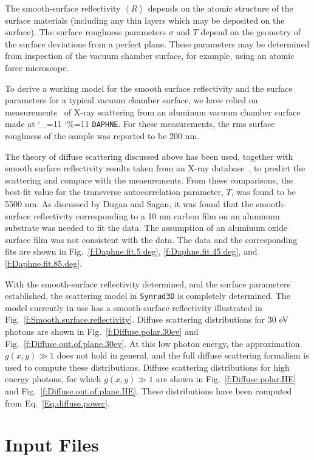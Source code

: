 \documentclass[11pt]{article}
\newcommand{\srthree}{\texttt{Synrad3D}\xspace}
\newcommand\ttcmd{\begingroup\catcode`\_=11 \catcode`\%=11 \dottcmd}
\newcommand\dottcmd[1]{\texttt{#1}\endgroup}
\newcommand{\vn}{\ttcmd}
\begin{document}
The smooth-surface reflectivity $\left<R\right>$ depends on the atomic
structure of the surface materials (including any thin layers which
may be deposited on the surface). The surface roughness parameters
$\sigma$ and $T$ depend on the geometry of the surface deviations from
a perfect plane. These parameters may be determined from inspection of
the vacuum chamber surface, for example, using an atomic force
microscope.

To derive a working model for the smooth surface reflectivity and the
surface parameters for a typical vacuum chamber surface, we have
relied on measurements~\cite{b:mehne} of X-ray scattering
from an aluminum vacuum chamber surface made at \vn{DAPHNE}. For
these measurements, the rms surface roughness of the sample was
reported to be 200 nm.

The theory of diffuse scattering discussed above has been used,
together with smooth surface reflectivity results taken from an X-ray
database~\cite{b:henke}, to predict the scattering and compare with
the measurements. From these comparisons, the best-fit value for the
transverse autocorrelation parameter, $T$, was found to be 5500 nm. As
discussed by Dugan and Sagan\cite{b:synrad3d},
it was found that the smooth-surface reflectivity
corresponding to a 10 nm carbon film on an aluminum substrate was
needed to fit the data. The assumption of an aluminum oxide surface
film was not consistent with the data. The data and the corresponding
fits are shown in Fig.~\ref{f:Daphne.fit.5.deg},
\ref{f:Daphne.fit.45.deg}, and \ref{f:Daphne.fit.85.deg}.

With the smooth-surface reflectivity determined, and the surface
parameters established, the scattering model in \srthree is
completely determined. The model currently in use has a smooth-surface
reflectivity illustrated in
Fig.~\ref{f:Smooth.surface.reflectivity}. Diffuse
scattering distributions for 30 eV photons are shown in
Fig.~\ref{f:Diffuse.polar.30ev} and
Fig.~\ref{f:Diffuse.out.of.plane.30ev}. At this low photon
energy, the approximation $g(x,y)\gg 1$ does not hold in general, and
the full diffuse scattering formalism is used to compute these
distributions. Diffuse scattering distributions for high energy
photons, for which $g(x,y)\gg 1$ are shown in
Fig.~\ref{f:Diffuse.polar.HE} and
Fig.~\ref{f:Diffuse.out.of.plane.HE}. These distributions
have been computed from Eq.~\ref{Eq.diffuse.power}.

\section{Input Files} 
\label{s:prog}
\end{document}

